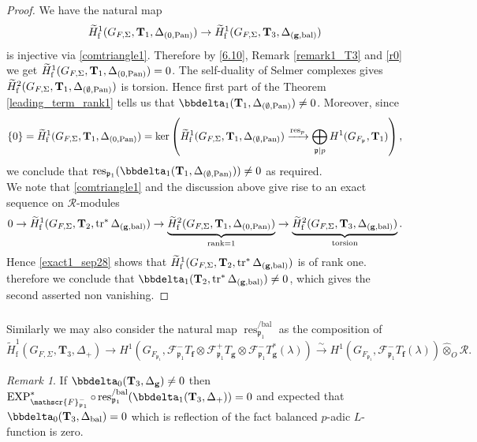 \documentclass[10pt]{amsart}
\numberwithin{equation}{section}
\theoremstyle{definition}
\theoremstyle{remark} %
\newtheorem{rmk}[thm]{Remark}
\newcommand{\pan}{\mathrm{Pan}}
\DeclareMathOperator{\res}{res}
\DeclareMathOperator{\tr}{{tr}^*}
\renewcommand{\b}{\mathrm{bal}}
\newcommand{\f}{\mathbf{f}}
\newcommand{\scrF}{\mathscr{F}}
\newcommand{\g}{\mathbf{g}}
\newcommand{\p}{\mathfrak{p}}
\newcommand{\R}{\mathcal{R}}
\newcommand{\T}{\mathbf{T}}
\begin{document}
		\begin{proof}
			We have the natural map
			$$ \widetilde{H}^1_{\rm f}(G_{F,\Sigma}, \T_1, \Delta_{(0,\pan)}) \rightarrow \widetilde{H}^1_{\rm f}(G_{F,\Sigma}, \T_3, \Delta_{(\g,\b)}) $$
			is injective via \ref{comtriangle1}. Therefore by \eqref{6.10}, Remark \ref{remark1_T3} and \cref{r0} we get $ \widetilde{H}_{\rm f}^1(G_{F,\Sigma}, \T_1, \Delta_{(0,\pan)}) = 0$. The self-duality of Selmer complexes gives $ \widetilde{H}_{\rm f}^2(G_{F,\Sigma}, \T_1, \Delta_{(\emptyset,\pan)}) $ is torsion. Hence first part of the Theorem \ref{leading_term_rank1} tells us that $ \bbdelta_1(\T_{1},\Delta_{(\emptyset,\pan)}) \ne 0 $. Moreover, since 
			$$ \{0\} =  \widetilde{H}^1_{\rm f}(G_{F,\Sigma}, \T_1, \Delta_{(0,\pan)}) = \ker\left(  \widetilde{H}^1_{\rm f}(G_{F,\Sigma}, \T_1, \Delta_{(\emptyset,\pan)}) \xrightarrow{\res_p} \bigoplus_{\p \mid p} H^1(G_{F_\p}, \T_{1}) \right),  
			$$
			we conclude that $ \res_{\p_1}(\bbdelta_1(\T_{1},\Delta_{(\emptyset,\pan)})) \ne 0 $ as required.\\
			We note that \ref{comtriangle1} and the discussion above give rise to an exact sequence on $ \R $-modules
			\begin{equation}\label{exact1_sep28}
				0 \rightarrow 	\widetilde{H}^1_{\rm f}(G_{F,\Sigma}, \T_2, \tr \Delta_{(\g,\b)}) \rightarrow\underbrace{ \widetilde{H}^2_{\rm f}(G_{F,\Sigma}, \T_1, \Delta_{(0,\pan)})}_{\rm rank =1} \rightarrow \underbrace{\widetilde{H}^2_{\rm f}(G_{F,\Sigma}, \T_3, \Delta_{(\g,\b)})}_{\rm torsion}. 	
			\end{equation} 
			Hence \ref{exact1_sep28} shows that $ \widetilde{H}^1_{\rm f}(G_{F,\Sigma}, \T_2, \tr \Delta_{(\g,\b)}) $ is of rank one. therefore we conclude that $ \bbdelta_1(\T_{2}, \tr\Delta_{(\g,\b)}) \ne 0 $, which gives the second asserted non vanishing.
		\end{proof}
		
		\subsubsection{}
		Similarly we may also consider the natural map $  \res^{/\b}_{\p_1} $ as the composition of
		$$  \widetilde{H}^1_{\mathrm{f}}(G_{F,\Sigma}, \T_{3}, \Delta_+) \rightarrow  H^1(G_{F_{\p_1}}, \scrF^-_{\p_1}T_{\f} \otimes \scrF^+_{\p_1}T_{\g} \otimes \scrF^-_{\p_1}T_{\g}^*(\lambda)) \xrightarrow{\sim} H^1(G_{F_{\p_1}}, \scrF^-_{\p_1}T_{\f}(\lambda)) \widehat{\otimes}_O \R .$$
		\begin{rmk}
			If $ \bbdelta_0(\T_{3},\Delta_{\g}) \ne 0 $ then $ 	\operatorname{EXP}^*_{\scrF^-_{\p_1}} \circ  \res^{/\b}_{\p_1} (\bbdelta_1(\T_{3},\Delta_{+})) = 0 $ and expected that $\bbdelta_0(\T_{3},\Delta_{\mathrm{bal}}) = 0$ which is reflection of the fact balanced $ p $-adic $ L $-function is zero.
		\end{rmk}
		
\end{document}
